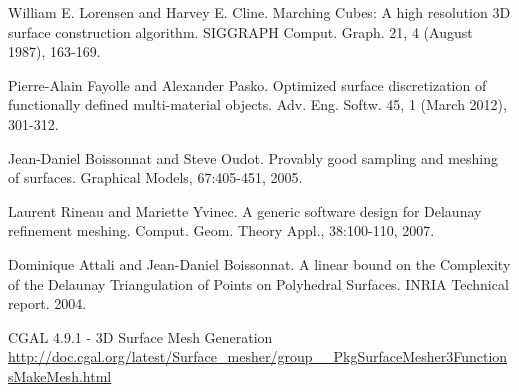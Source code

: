\documentclass{article}
\begin{document}

\begin{thebibliography}{9}
William E. Lorensen and Harvey E. Cline. Marching Cubes: A high resolution 3D surface construction algorithm. SIGGRAPH Comput. Graph. 21, 4 (August 1987), 163-169.

Pierre-Alain Fayolle and Alexander Pasko. Optimized surface discretization of functionally defined multi-material objects. Adv. Eng. Softw. 45, 1 (March 2012), 301-312.

Jean-Daniel Boissonnat and Steve Oudot. Provably good sampling and meshing of surfaces. Graphical Models, 67:405-451, 2005.

Laurent Rineau and Mariette Yvinec. A generic software design for Delaunay refinement meshing. Comput. Geom. Theory Appl., 38:100-110, 2007.

Dominique Attali and Jean-Daniel Boissonnat. A linear bound on the Complexity of the Delaunay Triangulation of Points on Polyhedral Surfaces. INRIA Technical report. 2004.

CGAL 4.9.1 - 3D Surface Mesh Generation \\
\url{http://doc.cgal.org/latest/Surface_mesher/group__PkgSurfaceMesher3FunctionsMakeMesh.html}
\end{thebibliography}

\end{document}
